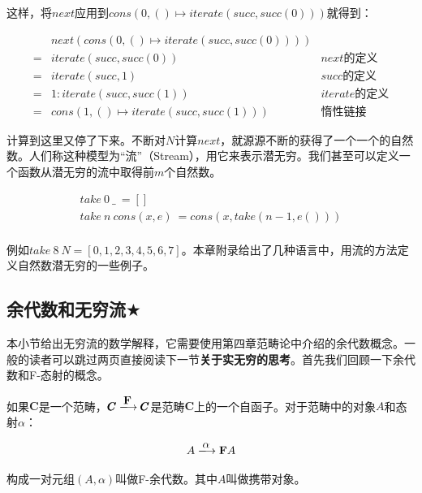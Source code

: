 \documentclass{article}
\begin{document}
这样，将$next$应用到$cons(0, () \mapsto iterate(succ, succ(0)))$就得到：

\[
\begin{array}{cll}
  & next(cons(0, () \mapsto iterate(succ, succ(0)))) & \\
= & iterate(succ, succ(0)) & next\text{的定义} \\
= & iterate(succ, 1) & succ\text{的定义} \\
= & 1 : iterate(succ, succ(1)) & iterate\text{的定义} \\
= & cons(1, () \mapsto iterate(succ, succ(1))) & \text{惰性链接}
\end{array}
\]

计算到这里又停了下来。不断对$N$计算$next$，就源源不断的获得了一个一个的自然数。人们称这种模型为“流”（Stream），用它来表示潜无穷。我们甚至可以定义一个函数从潜无穷的流中取得前$m$个自然数。

\[
\begin{array}{l}
take\ 0\ \_\ = [] \\
take\ n\ cons(x, e)\ = cons(x, take(n-1, e())) \\
\end{array}
\]

例如$take\ 8\ N = [0, 1, 2, 3, 4, 5, 6, 7]$。本章附录给出了几种语言中，用流的方法定义自然数潜无穷的一些例子。

\begin{Exercise}
\end{Exercise}

\subsection{余代数和无穷流$\bigstar$}

本小节给出无穷流的数学解释，它需要使用第四章范畴论中介绍的余代数概念。一般的读者可以跳过两页直接阅读下一节\textbf{关于实无穷的思考}。首先我们回顾一下余代数和F-态射的概念。

\begin{definition}
如果$\pmb{C}$是一个范畴，$\pmb{C} \arrowto{\mathbf{F}} \pmb{C}$是范畴$\pmb{C}$上的一个自函子。对于范畴中的对象$A$和态射$\alpha$：

\[
  A \arrowto{\alpha} \mathbf{F} A
\]

构成一对元组$(A, \alpha)$叫做F-余代数。其中$A$叫做携带对象。
\end{definition}
\end{document}
